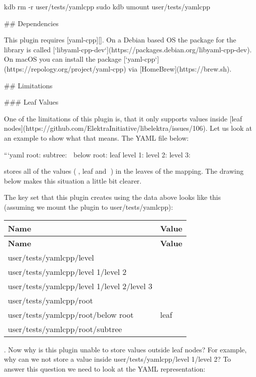 kdb rm -\/r user/tests/yamlcpp sudo kdb umount user/tests/yamlcpp 
\begin{DoxyCode}
## Dependencies

This plugin requires [yaml-cpp][]. On a Debian based OS the package for the library is called
       [`libyaml-cpp-dev`](https://packages.debian.org/libyaml-cpp-dev). On macOS you can install the package
       [`yaml-cpp`](https://repology.org/project/yaml-cpp) via [HomeBrew](https://brew.sh).

## Limitations

### Leaf Values

One of the limitations of this plugin is, that it only supports values inside [leaf
       nodes](https://github.com/ElektraInitiative/libelektra/issues/106). Let us look at an example to show what that means. The YAML
       file below:

```yaml
root:
  subtree: 🍂
  below root: leaf
level 1:
  level 2:
    level 3: 🍁
\end{DoxyCode}


stores all of the values ({\ttfamily 🍂}, {\ttfamily leaf} and {\ttfamily 🍁}) in the leaves of the mapping. The drawing below makes this situation a little bit clearer.



The key set that this plugin creates using the data above looks like this (assuming we mount the plugin to {\ttfamily user/tests/yamlcpp})\+:

\tabulinesep=1mm
\begin{longtabu} spread 0pt [c]{*{2}{|X[-1]}|}
\hline
\rowcolor{\tableheadbgcolor}\textbf{ Name }&\textbf{ Value  }\\
\endfirsthead
\hline
\endfoot
\hline
\rowcolor{\tableheadbgcolor}\textbf{ Name }&\textbf{ Value  }\\
\endhead
user/tests/yamlcpp/level &\\
user/tests/yamlcpp/level 1/level 2 &\\
user/tests/yamlcpp/level 1/level 2/level 3 &🍁 \\
user/tests/yamlcpp/root &\\
user/tests/yamlcpp/root/below root &leaf \\
user/tests/yamlcpp/root/subtree &🍂 \\
\end{longtabu}
. Now why is this plugin unable to store values outside leaf nodes? For example, why can we not store a value inside {\ttfamily user/tests/yamlcpp/level 1/level 2}? To answer this question we need to look at the Y\+A\+ML representation\+:


